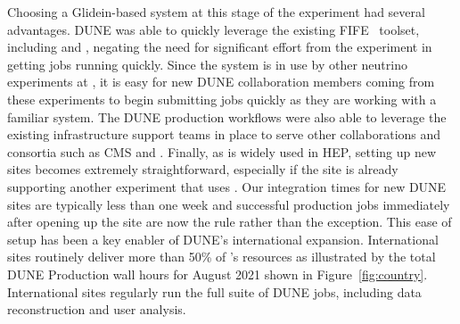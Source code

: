 \documentclass[../main-v1.tex]{subfiles}
\begin{document}
Choosing a Glidein-based system at this stage of the experiment had several advantages. DUNE was able to quickly leverage the existing FIFE~\cite{herner2019advances} toolset, including  and , negating the
need for significant effort from the experiment in getting jobs running quickly. Since the system is in use by other neutrino experiments at , it is easy for new DUNE collaboration members coming from these experiments to 
begin submitting jobs quickly as they are working with a familiar system. The DUNE production workflows were also able to leverage the existing infrastructure support teams in place to serve other collaborations and consortia such as 
CMS and . Finally, as  is widely used in HEP, setting up new sites becomes extremely straightforward, especially if the site is already supporting another experiment that uses . Our integration times for new 
DUNE sites are typically less than one week and successful production jobs immediately after opening up the site are now the rule rather than the exception. This ease of setup has been a key enabler of DUNE's international expansion. International sites routinely deliver more than 50\% of 's  resources as illustrated by  the total DUNE Production wall hours for August 2021  shown in Figure~\ref{fig:country}. International sites regularly run the full suite of DUNE jobs, including  data reconstruction and user analysis. %
\end{document}
